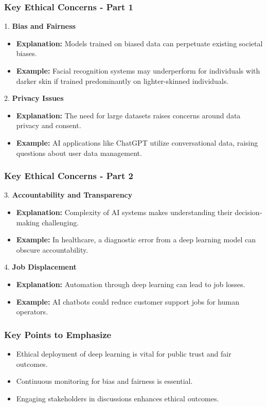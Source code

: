 \documentclass[aspectratio=169]{beamer}
\begin{document}
\begin{frame}[fragile]
    \frametitle{Key Ethical Concerns - Part 1}
    1. \textbf{Bias and Fairness}
        \begin{itemize}
            \item \textbf{Explanation:} Models trained on biased data can perpetuate existing societal biases.
            \item \textbf{Example:} Facial recognition systems may underperform for individuals with darker skin if trained predominantly on lighter-skinned individuals.
        \end{itemize}

    2. \textbf{Privacy Issues}
        \begin{itemize}
            \item \textbf{Explanation:} The need for large datasets raises concerns around data privacy and consent.
            \item \textbf{Example:} AI applications like ChatGPT utilize conversational data, raising questions about user data management.
        \end{itemize}
\end{frame}

\begin{frame}[fragile]
    \frametitle{Key Ethical Concerns - Part 2}
    3. \textbf{Accountability and Transparency}
        \begin{itemize}
            \item \textbf{Explanation:} Complexity of AI systems makes understanding their decision-making challenging.
            \item \textbf{Example:} In healthcare, a diagnostic error from a deep learning model can obscure accountability.
        \end{itemize}

    4. \textbf{Job Displacement}
        \begin{itemize}
            \item \textbf{Explanation:} Automation through deep learning can lead to job losses.
            \item \textbf{Example:} AI chatbots could reduce customer support jobs for human operators.
        \end{itemize}
\end{frame}

\begin{frame}[fragile]
    \frametitle{Key Points to Emphasize}
    \begin{itemize}
        \item Ethical deployment of deep learning is vital for public trust and fair outcomes.
        \item Continuous monitoring for bias and fairness is essential.
        \item Engaging stakeholders in discussions enhances ethical outcomes.
    \end{itemize}
\end{frame}
\end{document}

